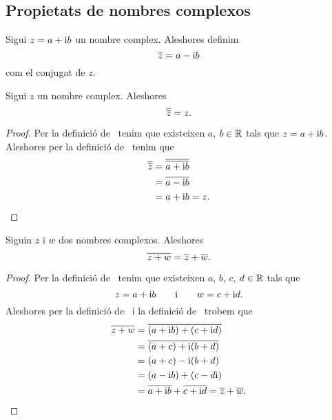 \documentclass[../Apunts.tex]{subfiles}
\begin{document}
	\subsection{Propietats de nombres complexos}
	\begin{definition}
		\label{def:conjugat d'un nombre complex}
		Sigui \(z=a+\mathrm{i} b\) un nombre complex. Aleshores definim
		\[\overline{z}=a-\mathrm{i} b\]
		com el conjugat de \(z\).
	\end{definition}
	\begin{proposition}
		\label{prop:el conjugat del conjugat d'un nombre complex és ell mateix}
		Sigui \(z\) un nombre complex. Aleshores
		\[\overline{\overline{z}}=z.\]
		\begin{proof}
			Per la definició de~ tenim que existeixen \(a\), \(b\in\mathbb{R}\) tals que \(z=a+\mathrm{i} b\). Aleshores per la definició de~ tenim que
			\begin{align*}
				\overline{\overline{z}}&=\overline{\overline{a+\mathrm{i} b}} \\
				&=\overline{a-\mathrm{i} b} \\
				&=a+\mathrm{i} b=z.\qedhere
			\end{align*}
		\end{proof}
	\end{proposition}
	\begin{proposition}
		\label{prop:el conjugat de la suma és la suma de conjugats}
		Siguin \(z\) i \(w\) dos nombres complexos. Aleshores
		\[\overline{z+w}=\overline{z}+\overline{w}.\]
		\begin{proof}
			Per la definició de~ tenim que existeixen \(a\), \(b\), \(c\), \(d\in\mathbb{R}\) tals que
			\[z=a+\mathrm{i} b\qquad\text{i}\qquad w=c+\mathrm{i} d.\]
			Aleshores per la definició de~ i la definició de~ trobem que
			\begin{align*}
				\overline{z+w}&=\overline{(a+\mathrm{i} b)+(c+\mathrm{i} d)} \\
				&=\overline{(a+c)+\mathrm{i}(b+d)} \\
				&=(a+c)-\mathrm{i}(b+d) \\
				&=(a-\mathrm{i} b)+(c-d\mathrm{i}) \\
				&=\overline{a+\mathrm{i} b}+\overline{c+\mathrm{i} d}=\overline{z}+\overline{w}.\qedhere
			\end{align*}
		\end{proof}
	\end{proposition}
\end{document}
